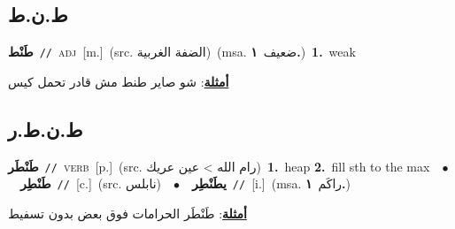 \documentclass[10pt,a4paper,twoside]{article} %
\begin{document}
\begin{multicols}{2}
\vspace{-3mm}
\subsection*{\color{blue}\foreignlanguage{arabic}{ط.ن.ط}\color{blue}{ (ntws)}} 

{\setlength\topsep{0pt}\textbf{\foreignlanguage{arabic}{طَنْط}}\ {\color{gray}\texttt{//}\color{black}}\ \textsc{adj}\ [m.]\ (src. \color{gray}\foreignlanguage{arabic}{الضفة الغربية}\color{black})\ \color{gray}(msa. \foreignlanguage{arabic}{ضعيف}~\foreignlanguage{arabic}{\textbf{١.}})\color{black}\ \textbf{1.}~weak\  \begin{flushright}\color{gray}\foreignlanguage{arabic}{\textbf{\underline{\foreignlanguage{arabic}{أمثلة}}}: شو صاير طنط مش قادر تحمل كيس}\end{flushright}\color{black}} \vspace{2mm}

\vspace{-3mm}
\subsection*{\color{blue}\foreignlanguage{arabic}{ط.ن.ط.ر}\color{blue}{}} 

{\setlength\topsep{0pt}\textbf{\foreignlanguage{arabic}{طَنْطَر}}\ {\color{gray}\texttt{//}\color{black}}\ \textsc{verb}\ [p.]\ (src. \color{gray}\foreignlanguage{arabic}{رام الله > عين عريك}\color{black})\ \textbf{1.}~heap  \textbf{2.}~fill sth to the max\ \ $\bullet$\ \ \setlength\topsep{0pt}\textbf{\foreignlanguage{arabic}{طَنْطِر}}\ {\color{gray}\texttt{//}\color{black}}\ [c.]\ (src. \color{gray}\foreignlanguage{arabic}{نابلس}\color{black})\ \ $\bullet$\ \ \setlength\topsep{0pt}\textbf{\foreignlanguage{arabic}{يطَنْطِر}}\ {\color{gray}\texttt{//}\color{black}}\ [i.]\ \color{gray}(msa. \foreignlanguage{arabic}{راكَم}~\foreignlanguage{arabic}{\textbf{١.}})\color{black}\  \begin{flushright}\color{gray}\foreignlanguage{arabic}{\textbf{\underline{\foreignlanguage{arabic}{أمثلة}}}: طَنْطَر الحرامات فوق بعض بدون تسفيط}\end{flushright}\color{black}} \vspace{2mm}


\end{multicols}
\end{document}
